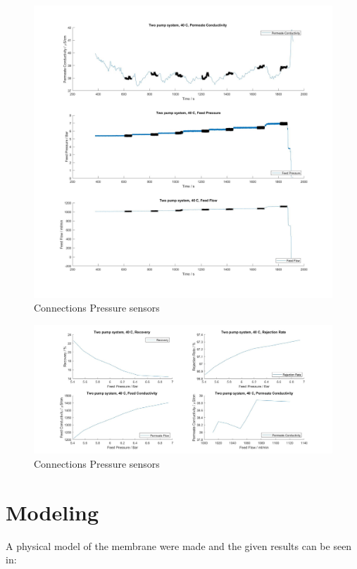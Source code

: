 \begin{figure}[H]
    \centering
    \includegraphics[width=1.1\textwidth]{RecIncrease40}
    \caption{Connections Pressure sensors}
    \label{fig:PressConn}
\end{figure}

\begin{figure}[H]
    \centering
    \includegraphics[width=1.1\textwidth]{RecIncrease40Key}
    \caption{Connections Pressure sensors}
    \label{fig:PressConn}
\end{figure}








\section{Modeling}
A physical model of the membrane were made and the given results can be seen in: 

